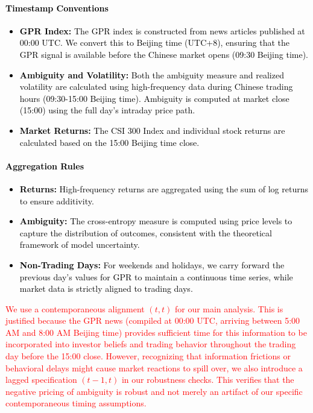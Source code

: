 \documentclass[preprint,12pt,authoryear]{elsarticle}
\begin{document}
\paragraph{\textcolor{black}{Timestamp Conventions}}
\textcolor{black}{\begin{itemize}
    \item \textbf{GPR Index:} The GPR index is constructed from news articles published at 00:00 UTC. We convert this to Beijing time (UTC+8), ensuring that the GPR signal is available before the Chinese market opens (09:30 Beijing time).
    \item \textbf{Ambiguity and Volatility:} Both the ambiguity measure and realized volatility are calculated using high-frequency data during Chinese trading hours (09:30-15:00 Beijing time). Ambiguity is computed at market close (15:00) using the full day's intraday price path.
    \item \textbf{Market Returns:} The CSI 300 Index and individual stock returns are calculated based on the 15:00 Beijing time close.
\end{itemize}}

\paragraph{\textcolor{black}{Aggregation Rules}}
\textcolor{black}{\begin{itemize}
    \item \textbf{Returns:} High-frequency returns are aggregated using the sum of log returns to ensure additivity.
    \item \textbf{Ambiguity:} The cross-entropy measure is computed using price levels to capture the distribution of outcomes, consistent with the theoretical framework of model uncertainty.
    \item \textbf{Non-Trading Days:} For weekends and holidays, we carry forward the previous day's values for GPR to maintain a continuous time series, while market data is strictly aligned to trading days.
\end{itemize}}

\textcolor{red}{We use a contemporaneous alignment $(t, t)$ for our main analysis. This is justified because the GPR news (compiled at 00:00 UTC, arriving between 5:00 AM and 8:00 AM Beijing time) provides sufficient time for this information to be incorporated into investor beliefs and trading behavior throughout the trading day before the 15:00 close. However, recognizing that information frictions or behavioral delays might cause market reactions to spill over, we also introduce a lagged specification $(t-1, t)$ in our robustness checks. This verifies that the negative pricing of ambiguity is robust and not merely an artifact of our specific contemporaneous timing assumptions.}
\end{document}
